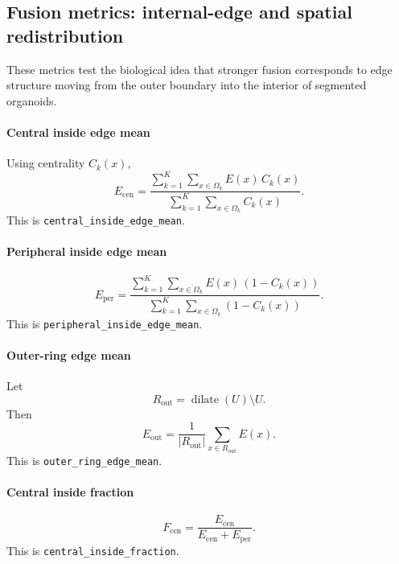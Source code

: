 \documentclass[11pt]{article}
\newcommand{\1}{\mathbf{1}}
\newcommand{\dilate}{\operatorname{dilate}}
\newcommand{\unionmask}{U}
\newcommand{\edgefield}{E}
\begin{document}
\subsection{Fusion metrics: internal-edge and spatial redistribution}
These metrics test the biological idea that stronger fusion corresponds to edge structure moving from the outer boundary into the interior of segmented organoids.

\paragraph{Central inside edge mean}
Using centrality $C_k(x)$,
\begin{equation}
E_{\mathrm{cen}} = \frac{\sum_{k=1}^{K}\sum_{x\in\Omega_k} \edgefield(x)\,C_k(x)}{\sum_{k=1}^{K}\sum_{x\in\Omega_k} C_k(x)}.
\end{equation}
This is \texttt{central\_inside\_edge\_mean}.

\paragraph{Peripheral inside edge mean}
\begin{equation}
E_{\mathrm{per}} = \frac{\sum_{k=1}^{K}\sum_{x\in\Omega_k} \edgefield(x)\,(1-C_k(x))}{\sum_{k=1}^{K}\sum_{x\in\Omega_k} (1-C_k(x))}.
\end{equation}
This is \texttt{peripheral\_inside\_edge\_mean}.

\paragraph{Outer-ring edge mean}
Let
\begin{equation}
R_{\mathrm{out}} = \dilate(\unionmask) \setminus \unionmask.
\end{equation}
Then
\begin{equation}
E_{\mathrm{out}} = \frac{1}{|R_{\mathrm{out}}|}\sum_{x\in R_{\mathrm{out}}} \edgefield(x).
\end{equation}
This is \texttt{outer\_ring\_edge\_mean}.

\paragraph{Central inside fraction}
\begin{equation}
F_{\mathrm{cen}} = \frac{E_{\mathrm{cen}}}{E_{\mathrm{cen}}+E_{\mathrm{per}}}.
\end{equation}
This is \texttt{central\_inside\_fraction}.
\end{document}
